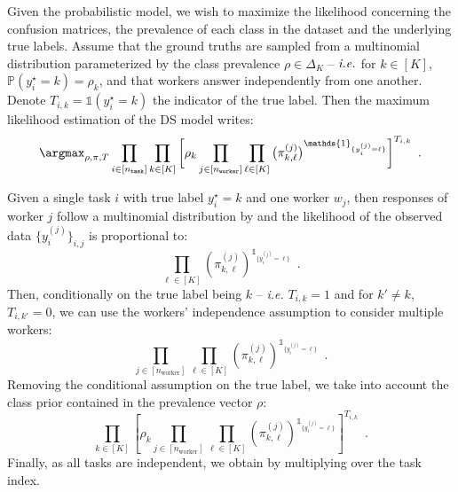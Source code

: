 Given the probabilistic model, we wish to maximize the likelihood concerning the confusion matrices, the prevalence of each class in the dataset and the underlying true labels.
Assume that the ground truths are sampled from a multinomial distribution parameterized by the class prevalence $\rho\in\Delta_K$ -- $\emph{i.e.}$ for $k\in[K]$, $\mathbb{P}(y_i^\star=k)=\rho_k$, and that workers answer independently from one another.
Denote $T_{i,k}=\mathds{1}(y_i^\star=k)$ the indicator of the true label.
Then the maximum likelihood estimation of the DS model writes:
\begin{equation}\label{eq:ds_likelihood}
\argmax_{\rho,\pi,T}\displaystyle\prod_{i\in [n_{\texttt{task}}]}\prod_{k \in [K]}\bigg[\rho_k\prod_{j\in [n_{\texttt{worker}}]}
    \prod_{\ell\in [K]}\big(\pi^{(j)}_{k, \ell}\big)^{\mathds{1}_{\{y_i^{(j)}=\ell\}}}
    \bigg]^{T_{i,k}} \enspace.
\end{equation}

\begin{constructionbox}
Given a single task $i$ with true label $y_i^\star=k$ and one worker $w_j$, then responses of worker $j$ follow a multinomial distribution by  and the likelihood of the observed data $\{y_i^{(j)}\}_{i,j}$ is proportional to:
\begin{equation*}
    \prod_{\ell\in[K]}\left(\pi^{(j)}_{k,\ell}\right)^{\mathds{1}_{\{y_i^{(j)}=\ell\}}} \enspace.
\end{equation*}
Then, conditionally on the true label being $k$ -- \emph{i.e.} $T_{i,k}=1$ and for $k'\neq k$, $T_{i,k'}=0$, we can use the workers' independence assumption to consider multiple workers:
\begin{equation*}
    \prod_{j\in [n_{\text{worker}}]}\prod_{\ell\in[K]}\left(\pi^{(j)}_{k,\ell}\right)^{\mathds{1}_{\{y_i^{(j)}=\ell\}}} \enspace.
\end{equation*}
Removing the conditional assumption on the true label, we take into account the class prior contained in the prevalence vector $\rho$:
\begin{equation*}
    \prod_{k\in[K]} \left[\rho_k\prod_{j\in [n_{\text{worker}}]}\prod_{\ell\in[K]}\left(\pi^{(j)}_{k,\ell}\right)^{\mathds{1}_{\{y_i^{(j)}=\ell\}}}\right]^{T_{i,k}} \enspace.
\end{equation*}
Finally, as all tasks are independent, we obtain  by multiplying over the task index.
\end{constructionbox}

